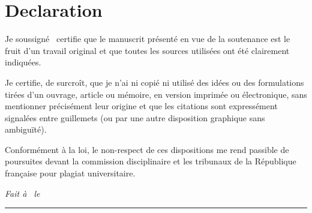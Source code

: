 %
\chapter*{Declaration}
\label{sec:declaration}
\thispagestyle{empty}

Je soussigné \thesisName~certifie que le manuscrit présenté en vue de la soutenance est le fruit d’un travail original et que toutes les sources utilisées ont été clairement indiquées.  

Je certifie, de surcroît, que je n’ai ni copié ni utilisé des idées ou des formulations tirées d’un ouvrage, article ou mémoire, en version imprimée ou électronique, sans mentionner précisément leur origine et que les citations sont expressément signalées entre guillemets (ou par une autre disposition graphique sans ambiguïté).  

Conformément à la loi, le non-respect de ces dispositions me rend passible de poursuites devant la commission disciplinaire et les tribunaux de la République française pour plagiat universitaire.


\bigskip

\noindent\textit{Fait à \thesisUniversityCity~le \thesisDate}

\smallskip

\begin{flushright}
	\begin{minipage}{5cm}
		\rule{\textwidth}{1pt}
		\centering\thesisName
	\end{minipage}
\end{flushright}

